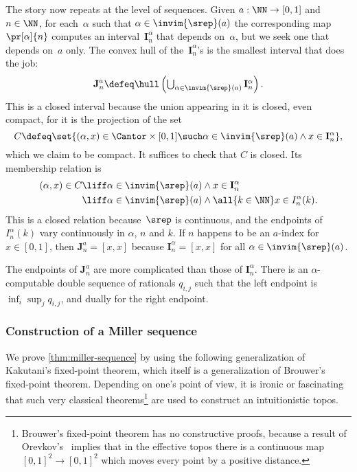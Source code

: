 The story now repeats at the level of sequences. Given $a : \NN \to [0,1]$ and $n \in \NN$, for each~$\alpha$ such that $\alpha \in \invim{\srep}(a)$ the corresponding map $\pr[\alpha]{n}$ computes an interval~$\mathbf{I}^\alpha_n$ that depends on~$\alpha$, but we seek one that depends on~$a$ only.
%
The convex hull of the~$\mathbf{I}^\alpha_n$'s is the smallest interval that does the job:
%
\begin{equation*}
  \mathbf{J}^a_n \defeq
  \textstyle
  \hull \left(
    \bigcup_{\alpha \in \invim{\srep}(a)} \mathbf{I}^\alpha_n
  \right).
\end{equation*}
%
This is a closed interval because the union appearing in it is closed, even compact, for it is the projection of the set
%
\begin{equation*}
  C \defeq \set{
    (\alpha, x) \in \Cantor \times [0,1] \such
    \alpha \in \invim{\srep}(a) \land x \in \mathbf{I}^\alpha_n
  },
\end{equation*}
%
which we claim to be compact.
It suffices to check that $C$ is closed. Its membership relation is
%
\begin{align*}
  (\alpha, x) \in C
  &\liff
  \alpha \in \invim{\srep}(a) \land x \in \mathbf{I}^\alpha_n \\
  &\liff
  \alpha \in \invim{\srep}(a) \land \all{k \in \NN} x \in I^\alpha_n(k).
\end{align*}
%
This is a closed relation because~$\srep$ is continuous, and the endpoints of $I^\alpha_n(k)$ vary continuously in $\alpha$, $n$ and $k$.
%
If $n$ happens to be an $a$-index for~$x \in [0,1]$, then $\mathbf{J}^a_n = [x,x]$ because $\mathbf{I}^\alpha_n = [x,x]$ for all $\alpha \in \invim{\srep}(a)$.
%

The endpoints of $\mathbf{J}^a_n$ are more complicated than those of $\mathbf{I}^\alpha_n$. There is an $\alpha$-computable double sequence of rationals $q_{i,j}$ such that the left endpoint is $\inf_i \sup_j q_{i,j}$, and dually for the right endpoint.


\subsubsection{Construction of a Miller sequence}
\label{sec:constr-mill-sequ}

We prove \cref{thm:miller-sequence} by using the following generalization of Kakutani's fixed-point theorem, which itself is a generalization of Brouwer's fixed-point theorem. Depending on one's point of view, it is ironic or fascinating that such very classical theorems\footnote{Brouwer's fixed-point theorem has no constructive proofs, because a result of Orevkov's~\cite{orevkov63} implies that in the effective topos there is a continuous map $[0,1]^2 \to [0,1]^2$ which moves every point by a positive distance.} are used to construct an intuitionistic topos.

